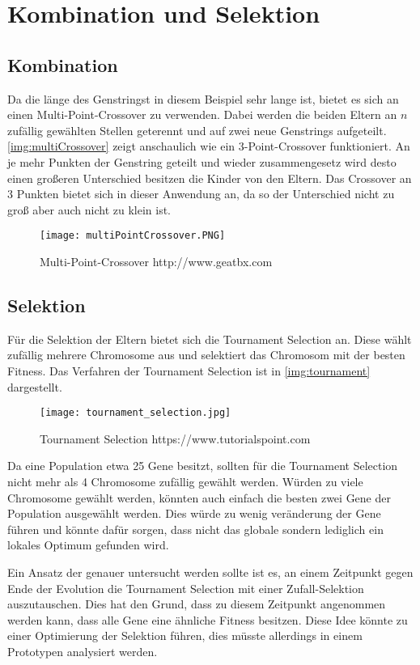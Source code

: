 \section{Kombination und Selektion}\label{sec:eltern}
\subsection{Kombination}
Da die länge des Genstringst in diesem Beispiel sehr lange ist, bietet es sich an einen Multi-Point-Crossover zu verwenden.
Dabei werden die beiden Eltern an $n$ zufällig gewählten Stellen geterennt und auf zwei neue Genstrings aufgeteilt.
\autoref{img:multiCrossover} zeigt anschaulich wie ein 3-Point-Crossover funktioniert. An je mehr Punkten
der Genstring geteilt und wieder zusammengesetz wird desto einen großeren Unterschied besitzen die Kinder von
den Eltern. Das Crossover an 3 Punkten bietet sich in dieser Anwendung an, da so der Unterschied nicht zu groß aber auch nicht zu klein ist.

\begin{figure}[h]
    \begin{minipage}{\textwidth}
	    \centering
        \texttt{[image: multiPointCrossover.PNG]}
	    \caption{Multi-Point-Crossover {http://www.geatbx.com}}
        \label{img:multiCrossover}
    \end{minipage}
\end{figure}

\subsection{Selektion}
Für die Selektion der Eltern bietet sich die Tournament Selection an.
Diese wählt zufällig mehrere Chromosome aus und selektiert das Chromosom mit der besten Fitness. Das Verfahren der
Tournament Selection ist in \autoref{img:tournament} dargestellt.


\begin{figure}
    \begin{minipage}{\textwidth}
        \texttt{[image: tournament\_selection.jpg]}
        \caption{Tournament Selection {https://www.tutorialspoint.com}}
        \label{img:tournament}
    \end{minipage}
\end{figure}

Da eine Population etwa 25 Gene besitzt, sollten für die Tournament Selection nicht mehr als 4 Chromosome zufällig gewählt werden.
Würden zu viele Chromosome gewählt werden, könnten auch einfach die besten zwei Gene der Population ausgewählt werden.
Dies würde zu wenig veränderung der Gene führen und könnte dafür sorgen, dass nicht das globale sondern
lediglich ein lokales Optimum gefunden wird.

Ein Ansatz der genauer untersucht werden sollte ist es, an einem Zeitpunkt gegen Ende der
Evolution die Tournament Selection mit einer Zufall-Selektion auszutauschen.
Dies hat den Grund, dass zu diesem Zeitpunkt angenommen werden kann, dass alle
Gene eine ähnliche Fitness besitzen. Diese Idee könnte zu einer Optimierung der Selektion führen, dies 
müsste allerdings in einem Prototypen analysiert werden. 
